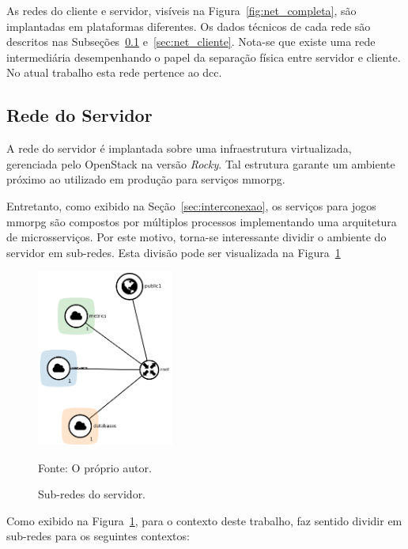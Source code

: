 As redes do cliente e servidor, visíveis na Figura~\ref{fig:net_completa}, são implantadas em plataformas diferentes.
%
Os dados técnicos de cada rede são descritos nas Subseções~\ref{sec:net_server} e~\ref{sec:net_cliente}.
%
Nota-se que existe uma rede intermediária desempenhando o papel da separação física entre servidor e cliente.
%
No atual trabalho esta rede pertence ao \ac{dcc}.

\subsection{Rede do Servidor}
\label{sec:net_server}



A rede do servidor é implantada sobre uma infraestrutura virtualizada, gerenciada pelo OpenStack na versão \textit{Rocky}.
%
Tal estrutura garante um ambiente próximo ao utilizado em produção para serviços \ac{mmorpg}.


Entretanto, como exibido na Seção~\ref{sec:interconexao}, os serviços para jogos \ac{mmorpg} são compostos por múltiplos processos implementando uma arquitetura de microsserviços.
%
Por este motivo, torna-se interessante dividir o ambiente do servidor em sub-redes.
%
Esta divisão pode ser visualizada na Figura~\ref{fig:network_server}



\begin{figure}[htb!]
  \caption{Sub-redes do servidor.}
  \label{fig:network_server}
  \includegraphics[width=0.4\textwidth]{figuras/network/circles_only_networks.png}
  \centering

  Fonte: O próprio autor.
\end{figure}



Como exibido na Figura~\ref{fig:network_server}, para o contexto deste trabalho, faz sentido dividir em sub-redes para os seguintes contextos:



